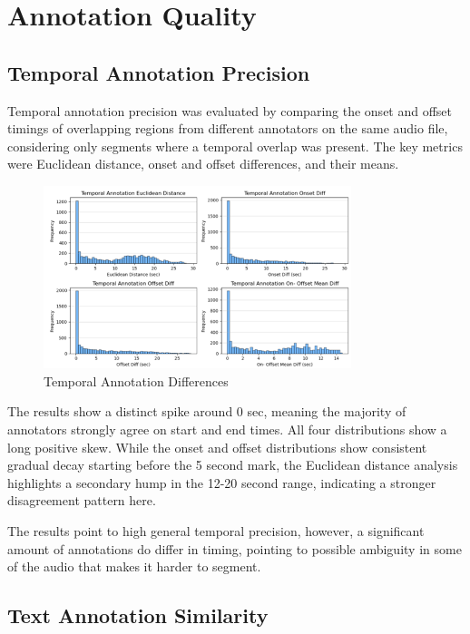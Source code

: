 \documentclass{article}
\begin{document}
\section{Annotation Quality}
\label{sec:annotation_quality}

\subsection{Temporal Annotation Precision}

Temporal annotation precision was evaluated by comparing the onset and offset timings of overlapping regions from different annotators on the same audio file, considering only segments where a temporal overlap was present. The key metrics were Euclidean distance, onset and offset differences, and their means.

\begin{figure}[H]
  \centering
  \includegraphics[width=0.8\textwidth]{figures/annotation_quality/temporal_annotation_differences.png}
  \caption{Temporal Annotation Differences}
  \label{fig:temporal_diff}
\end{figure}

The results show a distinct spike around 0 sec, meaning the majority of annotators strongly agree on start and end times. All four distributions show a long positive skew. While the onset and offset distributions show consistent gradual decay starting before the 5 second mark, the Euclidean distance analysis highlights a secondary hump in the 12-20 second range, indicating a stronger disagreement pattern here.

The results point to high general temporal precision, however, a significant amount of annotations do differ in timing, pointing to possible ambiguity in some of the audio that makes it harder to segment.

\subsection{Text Annotation Similarity}
\end{document}
